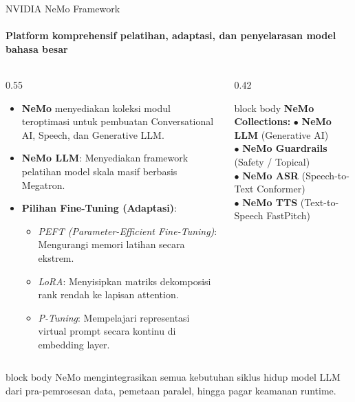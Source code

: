 \documentclass[aspectratio=169,t]{beamer}
\newcommand{\takeaway}[1]{%
  \vspace{0.1em}
  \begin{beamercolorbox}[rounded=true,shadow=false,sep=5pt]{block body}
    \centering\footnotesize\color{nvlightgreen}#1
  \end{beamercolorbox}%
}
\begin{document}
\begin{frame}{NVIDIA NeMo Framework}
  \framesubtitle{Platform komprehensif pelatihan, adaptasi, dan penyelarasan model bahasa besar}
  \begin{columns}[T]
    \begin{column}{0.55\textwidth}
      \begin{itemize}\small
        \item \textbf{NeMo} menyediakan koleksi modul teroptimasi untuk pembuatan Conversational AI, Speech, dan Generative LLM.
        \item \textbf{NeMo LLM}: Menyediakan framework pelatihan model skala masif berbasis Megatron.
        \item \textbf{Pilihan Fine-Tuning (Adaptasi)}:
          \begin{itemize}\scriptsize
            \item \emph{PEFT (Parameter-Efficient Fine-Tuning)}: Mengurangi memori latihan secara ekstrem.
            \item \emph{LoRA}: Menyisipkan matriks dekomposisi rank rendah ke lapisan attention.
            \item \emph{P-Tuning}: Mempelajari representasi virtual prompt secara kontinu di embedding layer.
          \end{itemize}
      \end{itemize}
    \end{column}
    \begin{column}{0.42\textwidth}
      \begin{center}
      \begin{beamercolorbox}[rounded=true,shadow=false,sep=8pt]{block body}
        {\footnotesize\color{nvblue}\textbf{NeMo Collections:}}
        \vspace{0.3em}
        {\scriptsize\color{nvwhite}
        $\bullet$ \textbf{NeMo LLM} (Generative AI)\\
        $\bullet$ \textbf{NeMo Guardrails} (Safety / Topical)\\
        $\bullet$ \textbf{NeMo ASR} (Speech-to-Text Conformer)\\
        $\bullet$ \textbf{NeMo TTS} (Text-to-Speech FastPitch)}
      \end{beamercolorbox}
      \end{center}
    \end{column}
  \end{columns}
  \takeaway{NeMo mengintegrasikan semua kebutuhan siklus hidup model LLM dari pra-pemrosesan data, pemetaan paralel, hingga pagar keamanan runtime.}
\end{frame}
\end{document}

